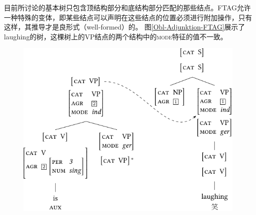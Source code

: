 目前所讨论的基本树只包含顶结构部分和底结构部分匹配的那些结点。FTAG允许一种特殊的变体，即某些结点可以声明在这些结点的位置必须进行附加操作，只有这样，其推导才是良形式（well-formed）的。
图\vref{Obl-Adjunktion-FTAG}展示了laughing的树，这棵树上的VP结点的两个结构中的\textsc{mode}特征的值不一致。
\begin{figure}
\centerline{%
\includegraphics{Figures/tag-obl-adj-ftag-crop}
}

\end{figure}
